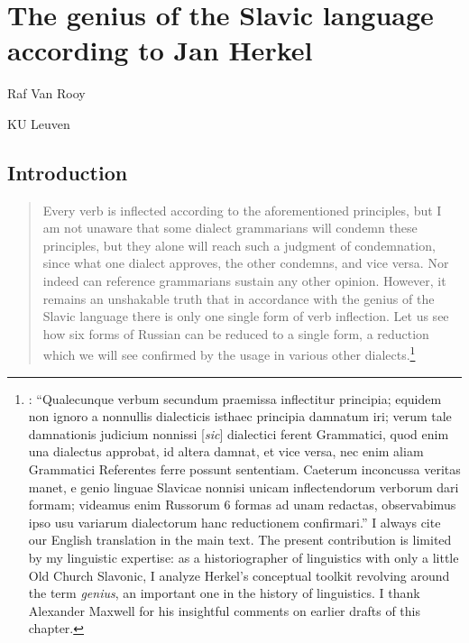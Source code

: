 \chapter{The genius of the Slavic language according to Jan Herkel}
\label{ch:Van_Rooy}

{\Large Raf Van Rooy}\smallskip

\noindent KU Leuven\bigskip

\section{Introduction}

\begin{quote}
   Every verb is inflected according to the aforementioned principles, but I am not unaware that some dialect grammarians will condemn these principles, but they alone will reach such a judgment of condemnation, since what one dialect approves, the other condemns, and vice versa. Nor indeed can reference grammarians sustain any other opinion. However, it remains an unshakable truth that in accordance with the genius of the Slavic language there is only one single form of verb inflection. Let us see how six forms of Russian can be reduced to a single form, a reduction which we will see confirmed by the usage in various other dialects.\footnote{\citet[146--147]{herkel_elementa_1826}: “Qualecunque verbum secundum praemissa inflectitur principia; equidem non ignoro a nonnullis dialecticis isthaec principia damnatum iri; verum tale damnationis judicium nonnissi [\textit{sic}] dialectici ferent Grammatici, quod enim una dialectus approbat, id altera damnat, et vice versa, nec enim aliam Grammatici Referentes ferre possunt sententiam. Caeterum inconcussa veritas manet, e genio linguae Slavicae nonnisi unicam inflectendorum verborum dari formam; videamus enim Russorum 6 formas ad unam redactas, observabimus ipso usu variarum dialectorum hanc reductionem confirmari.” I always cite our English translation in the main text. The present contribution is limited by my linguistic expertise: as a historiographer of linguistics with only a little Old Church Slavonic, I analyze Herkel’s conceptual toolkit revolving around the term \textit{genius}, an important one in the history of linguistics. I thank Alexander Maxwell for his insightful comments on earlier drafts of this chapter.}
\end{quote}

